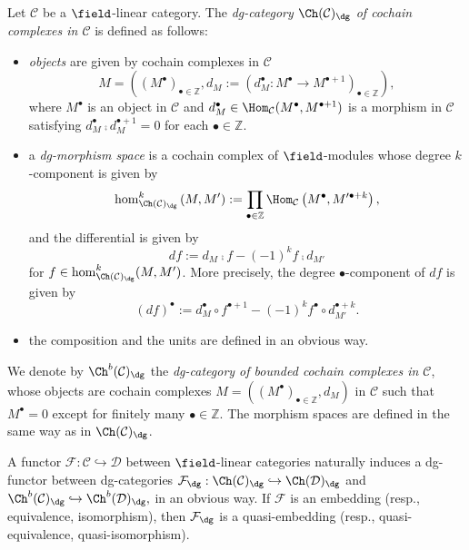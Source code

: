 \begin{defn}
Let $\mathcal{C}$ be a $\field$-linear category.
The \emph{dg-category $\Ch(\mathcal{C})_{\dg}$ of cochain complexes in $\mathcal{C}$} is defined as follows:
\begin{itemize}
\item
\emph{objects} are given by cochain complexes in $\mathcal{C}$
$$
M
=
\left(\left(M^{\bullet}\right)_{\bullet\in\mathbb{Z}},
d_M:=\left(d_M^\bullet:M^{\bullet}\rightarrow M^{\bullet+1}\right)_{\bullet\in\mathbb{Z}}\right),
$$
where $M^{\bullet}$ is an object in $\mathcal{C}$ and
$d_M^{\bullet}\in\Hom_{\mathcal{C}}(M^{\bullet},M^{\bullet+1})$
is a morphism in $\mathcal{C}$
satisfying
$d_M^{\bullet}\comp d_M^{\bullet+1}=0$
for each $\bullet\in\mathbb{Z}$.


\item
a \emph{dg-morphism space}
is a cochain complex of $\field$-modules
whose degree $k$-component is given by
$$
\hom_{\Ch(\mathcal{C})_{\dg}}^k
\left(
M,M'
\right)
:=
\prod_{\bullet\in\mathbb{Z}}
\Hom_{\mathcal{C}}\left(M^{\bullet},M'^{\bullet+k}\right),
$$
and the differential is given by
$$
df:=d_M\comp f - (-1)^k f\comp d_{M'}
$$
for $f\in \hom_{\Ch(\mathcal{C})_{\dg}}^k(M,M')$.
More precisely,
the degree $\bullet$-component of $df$
is given by
$$
(df)^{\bullet}
:=
d_M^{\bullet}\circ f^{\bullet+1}
-
(-1)^k
f^{\bullet}\circ d_{M'}^{\bullet+k}.
$$
\item
the composition and the units are defined in an obvious way.

\end{itemize}


We denote by
$\Ch^b(\mathcal{C})_{\dg}$
the \emph{dg-category of bounded cochain complexes in $\mathcal{C}$},
whose objects are cochain complexes
$M=\left(\left(M^{\bullet}\right)_{\bullet\in\mathbb{Z}},d_M\right)$
in $\mathcal{C}$
such that
$M^{\bullet}=0$ except for finitely many $\bullet\in\mathbb{Z}$.
The morphism spaces are defined in the same way as in $\Ch(\mathcal{C})_{\dg}$.
\end{defn}
\begin{rmk}\label{rmk:EmbeddingOfCochainComplexes}
A functor
$\mathcal{F}:\mathcal{C}\hookrightarrow\mathcal{D}$
between $\field$-linear categories
naturally induces a dg-functor between dg-categories
$
\mathcal{F}_{\dg}:
\Ch(\mathcal{C})_{\dg}
\hookrightarrow
\Ch(\mathcal{D})_{\dg}
$
and
$
\Ch^b(\mathcal{C})_{\dg}
\hookrightarrow
\Ch^b(\mathcal{D})_{\dg},
$
in an obvious way.
If
$\mathcal{F}$ is an embedding
(resp., equivalence, isomorphism),
then
$\mathcal{F}_{\dg}$
is a quasi-embedding
(resp., quasi-equivalence, quasi-isomorphism).
\end{rmk}
